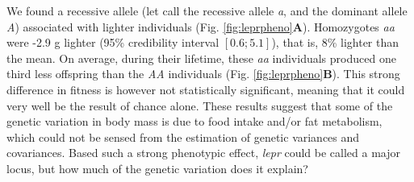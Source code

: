 We found a recessive allele (let call the recessive allele \emph{a}, and the dominant allele \emph{A}) associated with lighter individuals (Fig. \ref{fig:leprpheno}\textbf{A}). Homozygotes \emph{aa} were -2.9 g lighter (95\% credibility interval $[0.6;5.1]$), that is, 8\% lighter than the mean. On average, during their lifetime, these \emph{aa} individuals produced one third less offspring than the \emph{AA} individuals (Fig. \ref{fig:leprpheno}\textbf{B}). This strong difference in fitness is however not statistically significant, meaning that it could very well be the result of chance alone. These results suggest that some of the genetic variation in body mass is due to food intake and/or fat metabolism, which could not be sensed from the estimation of genetic variances and covariances. 
Based such a strong phenotypic effect, \emph{lepr} could be called a major locus, but how much of the genetic variation does it explain?


